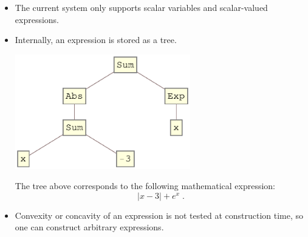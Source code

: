 \begin{itemize}
\item The current system only supports scalar variables and scalar-valued expressions.
\item Internally, an expression is stored as a tree.
\begin{center}
\includegraphics[width=0.6\textwidth]{poster/expr}
\end{center}
The tree above corresponds to the following mathematical expression:
\begin{equation*}
|x-3|+e^x \; .
\end{equation*}
\item Convexity or concavity of an expression is not tested at construction time, so one can construct arbitrary expressions.
\end{itemize}
